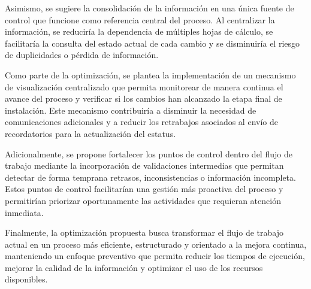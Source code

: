 \documentclass[12pt]{article}
\begin{document}
Asimismo, se sugiere la consolidación de la información en una única fuente de control que funcione como referencia central del proceso. Al centralizar la información, se reduciría la dependencia de múltiples hojas de cálculo, se facilitaría la consulta del estado actual de cada cambio y se disminuiría el riesgo de duplicidades o pérdida de información.

Como parte de la optimización, se plantea la implementación de un mecanismo de visualización centralizado que permita monitorear de manera continua el avance del proceso y verificar si los cambios han alcanzado la etapa final de instalación. Este mecanismo contribuiría a disminuir la necesidad de comunicaciones adicionales y a reducir los retrabajos asociados al envío de recordatorios para la actualización del estatus.

Adicionalmente, se propone fortalecer los puntos de control dentro del flujo de trabajo mediante la incorporación de validaciones intermedias que permitan detectar de forma temprana retrasos, inconsistencias o información incompleta. Estos puntos de control facilitarían una gestión más proactiva del proceso y permitirían priorizar oportunamente las actividades que requieran atención inmediata.

Finalmente, la optimización propuesta busca transformar el flujo de trabajo actual en un proceso más eficiente, estructurado y orientado a la mejora continua, manteniendo un enfoque preventivo que permita reducir los tiempos de ejecución, mejorar la calidad de la información y optimizar el uso de los recursos disponibles.
\end{document}
